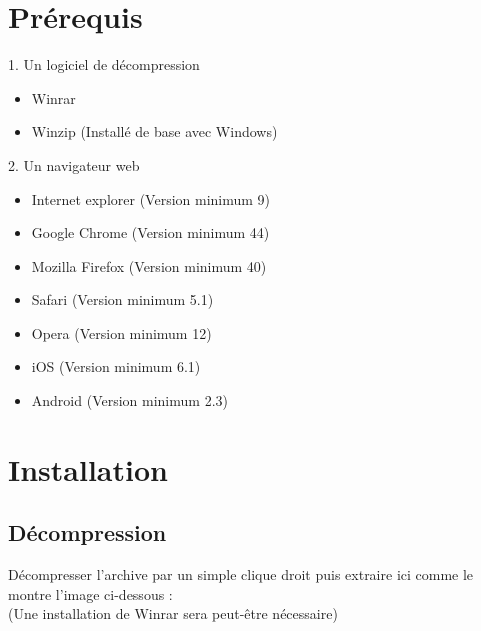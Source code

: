 \documentclass{article}
\begin{document}
\section{Prérequis}
1. Un logiciel de décompression
\begin{itemize}
  \item Winrar
  \item Winzip (Installé de base avec Windows)
\end{itemize}
2. Un navigateur web 
\begin{itemize}
  \item Internet explorer (Version minimum 9)
  \item Google Chrome (Version minimum 44)
  \item Mozilla Firefox (Version minimum 40)
  \item Safari (Version minimum 5.1)
  \item Opera (Version minimum 12)
  \item iOS (Version minimum 6.1)
  \item Android (Version minimum 2.3)
\end{itemize}

\newpage
\section{Installation}
\subsection{Décompression}
\hspace*{0.6cm}Décompresser l'archive par un simple clique droit puis extraire ici comme le montre l'image ci-dessous :\\
(Une installation de Winrar sera peut-être nécessaire)
\vspace{0.5cm}\\
\end{document}
